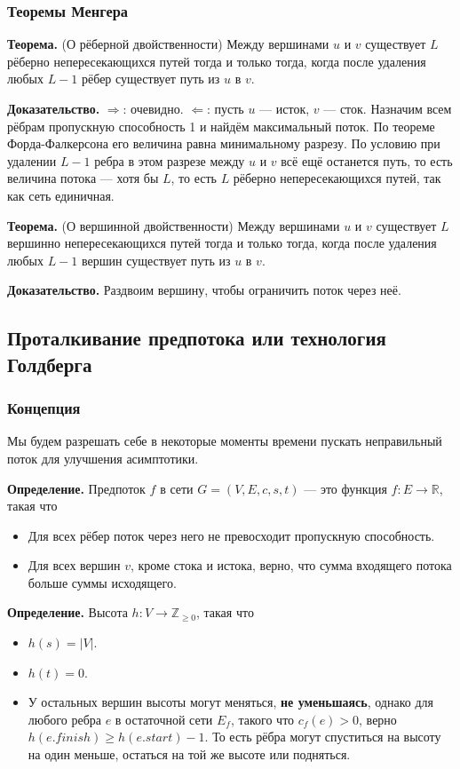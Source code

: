 \subsubsection{Теоремы Менгера}
\textbf{Теорема.} (О рёберной двойственности) Между вершинами $u$ и $v$ существует $L$ рёберно непересекающихся путей тогда и только тогда, когда после удаления любых $L - 1$ рёбер существует путь из $u$ в $v$.

\textbf{Доказательство.} $\Rightarrow$: очевидно. 
$\Leftarrow$: пусть $u$ --- исток, $v$ --- сток. Назначим всем рёбрам пропускную способность 1 и найдём максимальный поток.
По теореме Форда-Фалкерсона его величина равна минимальному разрезу.
По условию при удалении $L - 1$ ребра в этом разрезе между $u$ и $v$ всё ещё останется путь, то есть величина потока --- хотя бы $L$, то есть $L$ рёберно непересекающихся путей, так как сеть единичная.

\textbf{Теорема.} (О вершинной двойственности) Между вершинами $u$ и $v$ существует $L$ вершинно непересекающихся путей тогда и только тогда, когда после удаления любых $L - 1$ вершин существует путь из $u$ в $v$.

\textbf{Доказательство.} Раздвоим вершину, чтобы ограничить поток через неё.

\subsection{Проталкивание предпотока или технология Голдберга}
\subsubsection{Концепция}
Мы будем разрешать себе в некоторые моменты времени пускать неправильный поток для улучшения асимптотики.

\textbf{Определение.} Предпоток $f$ в сети $G = (V, E, c, s, t)$ --- это функция $f: E \to \mathbb R$, такая что
\begin{itemize}
    \item Для всех рёбер поток через него не превосходит пропускную способность.
    \item Для всех вершин $v$, кроме стока и истока, верно, что сумма входящего потока больше суммы исходящего.
\end{itemize}

\textbf{Определение.} Высота $h: V \to \mathbb Z_{\ge 0}$, такая что
\begin{itemize}
    \item $h(s) = |V|$.
    \item $h(t) = 0$.
    \item У остальных вершин высоты могут меняться, \textbf{не уменьшаясь}, однако для любого ребра $e$ в остаточной сети $E_f$, такого что $c_f(e) > 0$, верно $h(e.finish) \ge h(e.start) - 1$.
        То есть рёбра могут спуститься на высоту на один меньше, остаться на той же высоте или подняться.
\end{itemize}

